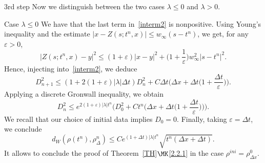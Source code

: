 \begin{step}{3rd step}%
Now we distinguish between the two cases $\lambda\leq 0$ and $\lambda>0$.

\begin{step}{Case $\lambda\leq 0$}
We have that the last term in~\eqref{interm2} is nonpositive. Using Young's inequality and the estimate $|x-Z(s;t^n,x)| \leq w_\infty (s-t^n)$, we get, for any $\varepsilon>0$,
\[
|Z(s;t^n,x)-y |^2 \leq (1+\varepsilon) |x-y|^2 + \Big(1+\frac{1}{\varepsilon}\Big) w_\infty^2 |s-t^n|^2.
\]
Hence, injecting into~\eqref{interm2}, we deduce
\[
D_{n+1}^2 \leq (1 + 2(1+\varepsilon)|\lambda| \Delta t ) D_n^2 + C \Delta t\Big(\Delta x+\Delta t\Big(1+\frac{\Delta t}{\varepsilon}\Big)\Big).
\]
Applying a discrete Gronwall inequality, we obtain
\[
D_n^2 \leq e^{2 (1+\varepsilon)|\lambda| t^n}\Big(D_0^2+ C t^n\Big(\Delta x+\Delta t\Big(1+\frac{\Delta t}{\varepsilon}\Big)\Big)\Big).
\]
We recall that our choice of initial data implies $D_0=0$. Finally, taking $\varepsilon=\Delta t$, we conclude
\[
d_W(\rho(t^n),\rho_{\Delta}^n) \leq C e^{(1+\Delta t)|\lambda| t^n} \sqrt{t^n(\Delta x+\Delta t)}.
\]
It allows to conclude the proof of Theorem~\ref{TH}$\MK$\eqref{2.2.1} in the case $\rho^{ini}=\rho_{\Delta x}^0$.
\end{step}


\end{step}

